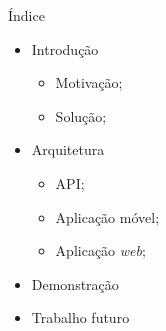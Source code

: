 \begin{frame}{Índice}
\vspace*{-7em}
\begin{itemize}
	\item Introdução
	\begin{itemize}
		\item Motivação;
		\item Solução;
	\end{itemize}
	
	\item Arquitetura
	\begin{itemize}
		\item API;
		\item Aplicação móvel;
		\item Aplicação \textit{web};
	\end{itemize}
	
	\item Demonstração
	
	\item Trabalho futuro
\end{itemize}
\end{frame}